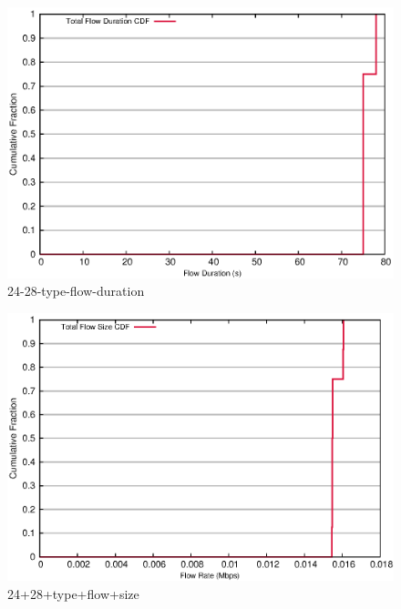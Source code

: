 \documentclass[landscape]{article}
\begin{document}
\begin{figure}[!hbt]
\centering
\includegraphics[width=1\textwidth]{24_28_flow_duration.eps}
\caption{24-28-type-flow-duration}

\end{figure}


\newpage

\begin{figure}[!hbt]
\centering
\includegraphics[width=1\textwidth]{24_28_flow_size.eps}
\caption{24+28+type+flow+size}

\end{figure}



\newpage
\end{document}
